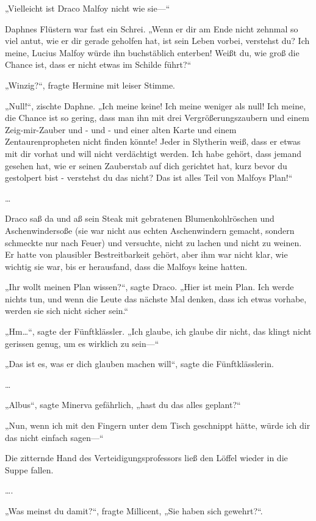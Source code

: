 {„Vielleicht ist Draco Malfoy nicht wie sie—“

Daphnes Flüstern war fast ein Schrei. „Wenn er dir am Ende nicht zehnmal so viel antut, wie er dir gerade geholfen hat, ist sein Leben vorbei, verstehst du? Ich meine, Lucius Malfoy würde ihn buchstäblich enterben! Weißt du, wie groß die Chance ist, dass er nicht etwas im Schilde führt?“

„Winzig?“, fragte Hermine mit leiser Stimme.

„Null!“, zischte Daphne. „Ich meine keine! Ich meine weniger als null! Ich meine, die Chance ist so gering, dass man ihn mit drei Vergrößerungszaubern und einem Zeig-mir-Zauber und - und - und einer alten Karte und einem Zentaurenpropheten nicht finden könnte! Jeder in Slytherin weiß, dass er etwas mit dir vorhat und will nicht verdächtigt werden. Ich habe gehört, dass jemand gesehen hat, wie er seinen Zauberstab auf dich gerichtet hat, kurz bevor du gestolpert bist - verstehst du das nicht? Das ist alles Teil von Malfoys Plan!“

…

Draco saß da und aß sein Steak mit gebratenen Blumenkohlröschen und Aschenwindersoße (sie war nicht aus echten Aschenwindern gemacht, sondern schmeckte nur nach Feuer) und versuchte, nicht zu lachen und nicht zu weinen. Er hatte von plausibler Bestreitbarkeit gehört, aber ihm war nicht klar, wie wichtig sie war, bis er herausfand, dass die Malfoys keine hatten.

„Ihr wollt meinen Plan wissen?“, sagte Draco. „Hier ist mein Plan. Ich werde nichts tun, und wenn die Leute das nächste Mal denken, dass ich etwas vorhabe, werden sie sich nicht sicher sein.“

„Hm…“, sagte der Fünftklässler. „Ich glaube, ich glaube dir nicht, das klingt nicht gerissen genug, um es wirklich zu sein—“

„Das ist es, was er dich glauben machen will“, sagte die Fünftklässlerin.

…

„Albus“, sagte Minerva gefährlich, „hast du das alles geplant?“

„Nun, wenn ich mit den Fingern unter dem Tisch geschnippt hätte, würde ich dir das nicht einfach sagen—“

Die zitternde Hand des Verteidigungsprofessors ließ den Löffel wieder in die Suppe fallen.

….

„Was meinst du damit?“, fragte Millicent, „Sie haben sich gewehrt?“.

}
